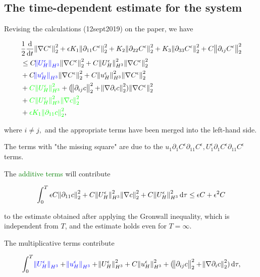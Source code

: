 \documentclass[11pt]{article}
\newcommand*\diff{\mathop{}\!\mathrm{d}}
\begin{document}
\subsection{The time-dependent estimate for the system}

Revising the calculations (12sept2019) on the paper, we have 

\begin{equation}
  \begin{split}
    & \frac{1}{2} \frac{\diff}{\diff t} \norm{\nabla C^\epsilon}_2^2 + \epsilon K_1 \norm{\partial_{11} C^\epsilon}_2^2 + K_2 \norm{\partial_{22} C^\epsilon}_2^2 + K_3 \norm{\partial_{33} C^\epsilon}_2^2 + C \norm{\partial_{ij} C^\epsilon}_2^2 \\
    & \leq C \textcolor{blue}{\norm{U_H^\epsilon}_{H^3}} \norm{\nabla C^\epsilon}_2^2 + C \norm{U_H^\epsilon}_{H^3}^2 \norm{\nabla C^\epsilon}_2^2 \\
    & + C \textcolor{blue}{\norm{u_H^\epsilon}_{H^3}} \norm{\nabla C^\epsilon}_2^2 + C \norm{u_H^\epsilon}_{H^3}^2 \norm{\nabla C^\epsilon}_2^2 \\
    & + \textcolor{green}{C \norm{U_H^\epsilon}_{H^3}^2} + (\norm{\partial_{ij} c}_2^2 + \norm{\nabla \partial_i c}_2^2)\norm{\nabla C^\epsilon}_2^2 \\
    & + \textcolor{green}{C \norm{U_H^\epsilon}_{H^3}^2 \norm{\nabla c}_2^2} \\
    & + \textcolor{green}{\epsilon K_1 \norm{\partial_{11} c}_2^2},
  \end{split}
\end{equation}

where $i \neq j,$ and the appropriate terms have been merged into the left-hand side.

The terms with "the missing square" are due to the $u_1 \partial_1 C^\epsilon \partial_{11} C^\epsilon, U_1^\epsilon \partial_1 C^\epsilon \partial_{11} C^\epsilon$ terms.

The \textcolor{green}{additive terms} will contribute

\[ \int_0^T \epsilon C \norm{\partial_{11} c}_2^2 + C \norm{U_H^\epsilon}_{H^3}^2 \norm{\nabla c}_2^2 + C \norm{U_H^\epsilon}_{H^3}^2  \diff \tau \leq \epsilon C + \epsilon^2 C \]

to the estimate obtained after applying the Gronwall inequality, which is independent from $T$, and the estimate holds even for $T= \infty.$

The multiplicative terms contribute

\[ \int_0^T \textcolor{blue}{\norm{U_H^\epsilon}_{H^3}} + \textcolor{blue}{\norm{u_H^\epsilon}_{H^3}} + \norm{U_H^\epsilon}_{H^3}^2 + C \norm{u_H^\epsilon}_{H^3}^2 + (\norm{\partial_{ij} c}_2^2 + \norm{\nabla \partial_i c}_2^2) \diff \tau,\]
\end{document}
